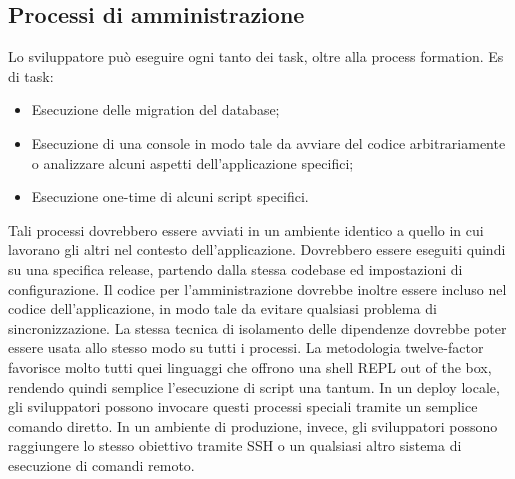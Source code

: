 \documentclass[PianoDiQualifica.tex]{subfiles}
\begin{document}
\subsection{Processi di amministrazione}
Lo sviluppatore può eseguire ogni tanto dei task, oltre alla process formation.
Es di task:
\begin{itemize}
\item Esecuzione delle migration del database;
\item Esecuzione di una console in modo tale da avviare del codice arbitrariamente o analizzare alcuni aspetti dell'applicazione specifici;
\item Esecuzione one-time di alcuni script specifici.
\end{itemize}
Tali processi dovrebbero essere avviati in un ambiente identico a quello in cui lavorano gli altri nel contesto dell'applicazione. Dovrebbero essere eseguiti quindi su una specifica release, partendo dalla stessa codebase ed impostazioni di configurazione. Il codice per l'amministrazione dovrebbe inoltre essere incluso nel codice dell'applicazione, in modo tale da evitare qualsiasi problema di sincronizzazione.
La stessa tecnica di isolamento delle dipendenze dovrebbe poter essere usata allo stesso modo su tutti i processi. 
La metodologia twelve-factor favorisce molto tutti quei linguaggi che offrono una shell REPL out of the box, rendendo quindi semplice l'esecuzione di script una tantum. In un deploy locale, gli sviluppatori possono invocare questi processi speciali tramite un semplice comando diretto. In un ambiente di produzione, invece, gli sviluppatori possono raggiungere lo stesso obiettivo tramite SSH o un qualsiasi altro sistema di esecuzione di comandi remoto.
\end{document}
